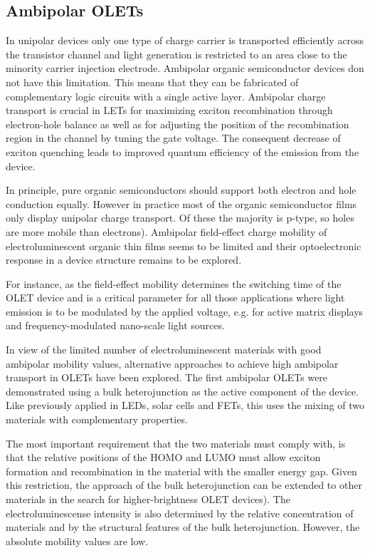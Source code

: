 \subsection{Ambipolar OLETs} %
In unipolar devices only one type of charge carrier is transported efficiently across the transistor channel and light generation is restricted to an area close to the minority carrier injection electrode. Ambipolar organic semiconductor devices don not have this limitation. This means that they can be fabricated of complementary logic circuits with a single active layer. Ambipolar charge transport is crucial in LETs for maximizing exciton recombination through electron-hole balance as well as for adjusting the position of the recombination region in the channel by tuning the gate voltage. The consequent decrease of exciton quenching leads to improved quantum efficiency of the emission from the device.

In principle, pure organic semiconductors should support both electron and hole conduction equally. However in practice most of the organic semiconductor films only display unipolar charge transport. Of these the majority is p-type, so holes are more mobile than electrons). Ambipolar field-effect charge mobility of electroluminescent organic thin films seems to be limited and their optoelectronic response in a device structure remains to be explored.

For instance, as the field-effect mobility determines the switching time of the OLET device and is a critical parameter for all those applications where light emission is to be modulated by the applied voltage, e.g. for active matrix displays and frequency-modulated nano-scale light sources.

In view of the limited number of electroluminescent materials with good ambipolar mobility values, alternative approaches to achieve high ambipolar transport in OLETs have been explored. The first ambipolar OLETs were demonstrated using a bulk heterojunction as the active component of the device. Like previously applied in LEDs, solar cells and FETs, this uses the mixing of two materials with complementary properties.

The most important requirement that the two materials must comply with, is that the relative positions of the HOMO and LUMO must allow exciton formation and recombination in the material with the smaller energy gap. Given this restriction, the approach of the bulk heterojunction can be extended to other materials in the search for higher-brightness OLET devices). The electroluminescense intensity is also determined by the relative concentration of materials and by the structural features of the bulk heterojunction. However, the absolute mobility values are low.

